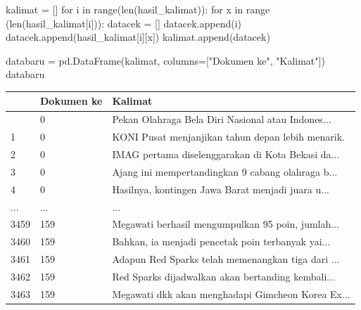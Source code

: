 \documentclass[
  letterpaper,
]{krantz}
\makeatletter
\newenvironment{Shaded}{\begin{snugshade}}{\end{snugshade}}
\newcommand{\BuiltInTok}[1]{\textcolor[rgb]{0.00,0.23,0.31}{#1}}
\newcommand{\ControlFlowTok}[1]{\textcolor[rgb]{0.00,0.23,0.31}{#1}}
\newcommand{\KeywordTok}[1]{\textcolor[rgb]{0.00,0.23,0.31}{#1}}
\newcommand{\NormalTok}[1]{\textcolor[rgb]{0.00,0.23,0.31}{#1}}
\newcommand{\OperatorTok}[1]{\textcolor[rgb]{0.37,0.37,0.37}{#1}}
\newcommand{\StringTok}[1]{\textcolor[rgb]{0.13,0.47,0.30}{#1}}
\newenvironment{kframe}{%
\medskip{}
\setlength{\fboxsep}{.8em}
 \def\at@end@of@kframe{}%
 \ifinner\ifhmode%
  \def\at@end@of@kframe{\end{minipage}}%
  \begin{minipage}{\columnwidth}%
 \fi\fi%
 \def\FrameCommand##1{\hskip\@totalleftmargin \hskip-\fboxsep
 \colorbox{shadecolor}{##1}\hskip-\fboxsep
     \hskip-\linewidth \hskip-\@totalleftmargin \hskip\columnwidth}%
 \MakeFramed {\advance\hsize-\width
   \@totalleftmargin\z@ \linewidth\hsize
   \@setminipage}}%
 {\par\unskip\endMakeFramed%
 \at@end@of@kframe}
\renewenvironment{Shaded}{\begin{kframe}}{\end{kframe}}
\makeatother
\begin{document}
\begin{Shaded}
\begin{Highlighting}[]
\NormalTok{kalimat }\OperatorTok{=}\NormalTok{ []}
\ControlFlowTok{for}\NormalTok{ i }\KeywordTok{in} \BuiltInTok{range}\NormalTok{(}\BuiltInTok{len}\NormalTok{(hasil\_kalimat)):}
  \ControlFlowTok{for}\NormalTok{ x }\KeywordTok{in} \BuiltInTok{range}\NormalTok{ (}\BuiltInTok{len}\NormalTok{(hasil\_kalimat[i])):}
\NormalTok{    datacek }\OperatorTok{=}\NormalTok{ []}
\NormalTok{    datacek.append(i)}
\NormalTok{    datacek.append(hasil\_kalimat[i][x])}
\NormalTok{    kalimat.append(datacek)}
\end{Highlighting}
\end{Shaded}

\begin{Shaded}
\begin{Highlighting}[]
\NormalTok{databaru }\OperatorTok{=}\NormalTok{ pd.DataFrame(kalimat, columns}\OperatorTok{=}\NormalTok{[}\StringTok{"Dokumen ke"}\NormalTok{, }\StringTok{"Kalimat"}\NormalTok{])}
\NormalTok{databaru}
\end{Highlighting}
\end{Shaded}

\begin{longtable}[]{@{}lll@{}}
\toprule\noalign{}
& Dokumen ke & Kalimat \\
\midrule\noalign{}
\endhead
\bottomrule\noalign{}
\endlastfoot
0 & 0 & Pekan Olahraga Bela Diri Nasional atau Indones... \\
1 & 0 & KONI Pusat menjanjikan tahun depan lebih menarik. \\
2 & 0 & IMAG pertama diselenggarakan di Kota Bekasi da... \\
3 & 0 & Ajang ini mempertandingkan 9 cabang olahraga b... \\
4 & 0 & Hasilnya, kontingen Jawa Barat menjadi juara u... \\
... & ... & ... \\
3459 & 159 & Megawati berhasil mengumpulkan 95 poin, jumlah... \\
3460 & 159 & Bahkan, ia menjadi pencetak poin terbanyak yai... \\
3461 & 159 & Adapun Red Sparks telah memenangkan tiga dari ... \\
3462 & 159 & Red Sparks dijadwalkan akan bertanding kembali... \\
3463 & 159 & Megawati dkk akan menghadapi Gimcheon Korea Ex... \\
\end{longtable}
\end{document}
